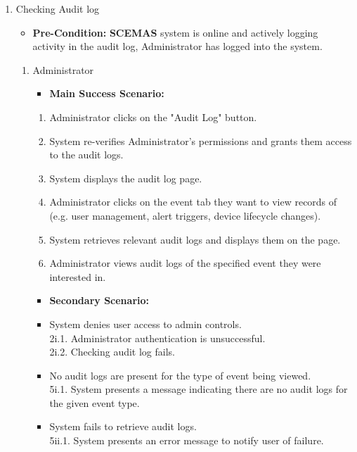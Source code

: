 \documentclass[]{article}
\begin{document}
\begin{enumerate}[{\bf BE1.}]
	\item Checking Audit log
		\begin{itemize}
			\item[] {\bf Pre-Condition:} \textbf{SCEMAS} system is online and actively logging activity in the audit log, Administrator has logged into the system.
		\end{itemize}
		\begin{enumerate}[{\bf VP1.}]
		\item Administrator
			\begin{itemize}
				\item[] {\bf Main Success Scenario:}
			\end{itemize}
			\begin{enumerate}[1.]
				\item Administrator clicks on the "Audit Log" button.
				\item System re-verifies Administrator's permissions and grants them access to the audit logs.
				\item System displays the audit log page.
				\item Administrator clicks on the event tab they want to view records of (e.g. user management, alert triggers, device lifecycle changes).
				\item System retrieves relevant audit logs and displays them on the page.
				\item Administrator views audit logs of the specified event they were interested in.
			\end{enumerate}
			\begin{itemize}
				\item[] {\bf Secondary Scenario:}
				\item[2i.] System denies user access to admin controls. \\
				\hspace{1cm}2i.1. Administrator authentication is unsuccessful. \\
				\hspace{1cm}2i.2. Checking audit log fails.
				\item[5i.] No audit logs are present for the type of event being viewed. \\
				\hspace{1cm}5i.1. System presents a message indicating there are no audit logs for the given event type.
				\item[5ii.] System fails to retrieve audit logs. \\
				\hspace{1cm}5ii.1. System presents an error message to notify user of failure. \\

\end{itemize}
\end{enumerate}
\end{enumerate}
\end{document}
